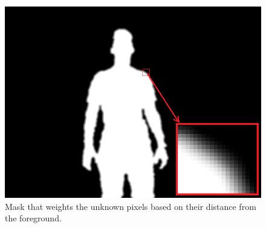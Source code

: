 \begin{figure}[t]
\centering
\includegraphics[width=0.8\columnwidth]{Chapter4/4/blur_weight.png}
\caption[Mask that weights the unknown pixels based on their distance from the foreground.]{Mask that weights the unknown pixels based on their distance from the foreground.}
\label{fig:blur-weight-f}
\end{figure}